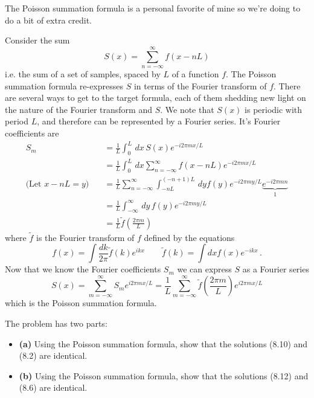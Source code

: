 
The Poisson summation formula is a personal favorite of mine so we're doing to do a bit of extra credit.


Consider the sum
\begin{equation*}
  S(x) = \sum_{n=-\infty}^\infty f(x - n L)
\end{equation*}
i.e. the sum of a set of samples, spaced by $L$ of a function $f$.
The Poisson summation formula re-expresses $S$ in terms of the Fourier transform of $f$.
There are several ways to get to the target formula, each of them shedding new light on the nature of the Fourier transform and $S$.
We note that $S(x)$ is periodic with period $L$, and therefore can be represented by a Fourier series.
It's Fourier coefficients are
\begin{align*}
  S_m
  &= \frac{1}{L} \int_0^L \, dx \, S(x) e^{-i 2\pi m x / L} \\
  &= \frac{1}{L} \int_0^L \, dx \sum_{n=-\infty}^\infty f(x - n L) e^{-i 2\pi m x / L} \\
  \text{(Let $x - n L = y$)} \quad 
  &= \frac{1}{L} \sum_{n=-\infty}^\infty \int_{-nL}^{(-n+1)L} \, dy f(y)
    e^{-i 2\pi m y / L} \underbrace{e^{-i 2 \pi m n}}_1 \\
  &= \frac{1}{L} \int_{-\infty}^\infty \, dy \, f(y) e^{-i 2 \pi m y / L} \\
  &= \frac{1}{L} \tilde{f} \left( \frac{2 \pi m}{L} \right)
\end{align*}
where $\tilde{f}$ is the Fourier transform of $f$ defined by the equations
\begin{equation*}
  f(x) = \int \frac{dk}{2\pi} \tilde{f}(k) e^{i k x}
  \qquad
  \tilde{f}(k) = \int dx f(x) e^{-i k x}
  \, .
\end{equation*}
Now that we know the Fourier coefficients $S_m$ we can express $S$ as a Fourier series
\begin{equation*}
  S(x)
  = \sum_{m=-\infty}^\infty S_m e^{i 2 \pi m x / L}
  = \frac{1}{L} \sum_{m=-\infty}^\infty \tilde{f}\left(\frac{2 \pi m}{L} \right) e^{i 2 \pi m x / L}
\end{equation*}
which is the Poisson summation formula.


The problem has two parts:

\begin{itemize}
  \item \textbf{(a)} Using the Poisson summation formula, show that the solutions (8.10) and (8.2) are identical.
  \item \textbf{(b)} Using the Poisson summation formula, show that the solutions (8.12) and (8.6) are identical.
\end{itemize}

